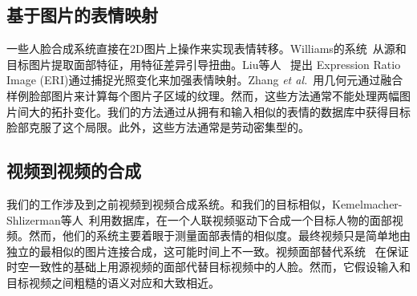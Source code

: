 \subsection{基于图片的表情映射}
一些人脸合成系统直接在2D图片上操作来实现表情转移。Williams的系统~\cite{performance_driven}从源和目标图片提取面部特征，用特征差异引导扭曲。Liu等人~\cite{eri} 提出 Expression Ratio Image (ERI)通过捕捉光照变化来加强表情映射。Zhang\emph{ et al.}~\cite{geometry_driven}用几何元通过融合样例脸部图片来计算每个图片子区域的纹理。然而，这些方法通常不能处理两幅图片间大的拓扑变化。我们的方法通过从拥有和输入相似的表情的数据库中获得目标脸部克服了这个局限。此外，这些方法通常是劳动密集型的。

\subsection{视频到视频的合成}
我们的工作涉及到之前视频到视频合成系统。和我们的目标相似，Kemelmacher-Shlizerman等人~\cite{eccv10}利用数据库，在一个人联视频驱动下合成一个目标人物的面部视频。然而，他们的系统主要着眼于测量面部表情的相似度。最终视频只是简单地由独立的最相似的图片连接合成，这可能时间上不一致。视频面部替代系统~\cite{replacement} 在保证时空一致性的基础上用源视频的面部代替目标视频中的人脸。然而，它假设输入和目标视频之间粗糙的语义对应和大致相近。


